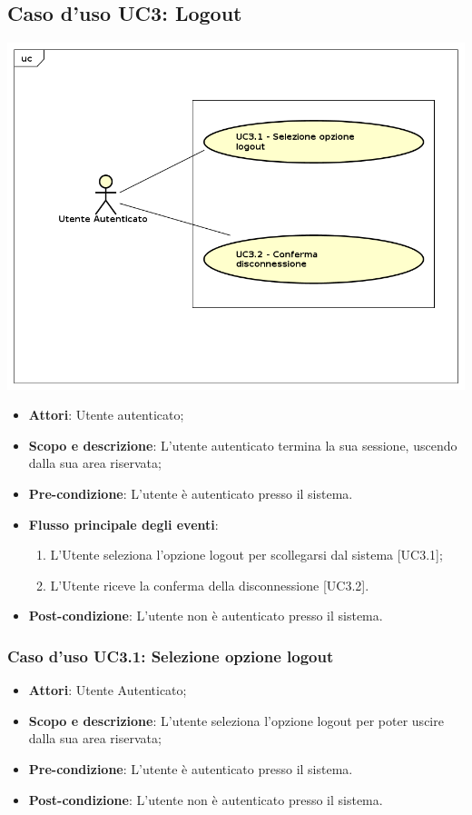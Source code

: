 \subsection{Caso d'uso UC3: Logout}
	\begin{center}
		\includegraphics[scale=0.5]{UML/UC3.png}
	\end{center}
	\begin{itemize}
		\item
			\textbf{Attori}: Utente autenticato;
		\item		
			\textbf{Scopo e descrizione}: L'utente autenticato termina la sua sessione, uscendo dalla sua area riservata;
		\item
			\textbf{Pre-condizione}: L'utente è autenticato presso il sistema. 
		\item
			\textbf{Flusso principale degli eventi}:
	       		\begin{enumerate}
					\item 	
					L'Utente seleziona l'opzione logout per scollegarsi dal sistema [UC3.1];
					\item
					L'Utente riceve la conferma della disconnessione [UC3.2].
	 			\end{enumerate}
		\item
			\textbf{	Post-condizione}: L'utente non è autenticato presso il sistema.
	\end{itemize}

\subsubsection{Caso d'uso UC3.1: Selezione opzione logout}
	\begin{itemize}
		\item		
			\textbf{Attori}: Utente Autenticato;
		\item
  			\textbf{Scopo e descrizione}: L'utente seleziona l'opzione logout per poter uscire dalla sua area riservata;
		\item
			\textbf{Pre-condizione}: L'utente è autenticato presso il sistema. 
		\item
			\textbf{Post-condizione}: L'utente non è autenticato presso il sistema.
	\end{itemize}

